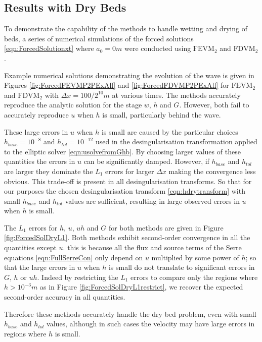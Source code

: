 \subsection{Results with Dry Beds} 
To demonstrate the capability of the methods to handle wetting and drying of beds, a series of numerical simulations of the forced solutions \eqref{eqn:ForcedSolutionxt} where $a_0 = 0m$ were conducted using $\text{FEVM}_2$ and $\text{FDVM}_2$. 

Example numerical solutions demonstrating the evolution of the wave is given in Figures \ref{fig:ForcedFEVMP2PExAll} and \ref{fig:ForcedFDVMP2PExAll} for $\text{FEVM}_2$ and $\text{FDVM}_2$ with $\Delta x = 100/ 2^{10} m$ at various times. The methods accurately reproduce the analytic solution for the stage $w$, $h$ and $G$. However, both fail to accurately reproduce $u$ when $h$ is small, particularly behind the wave.

These large errors in $u$ when $h$ is small are caused by the particular choices $h_{{base}} = 10^{-8}$ and $h_{{tol}}  = 10^{-12}$ used in the desingularisation transformation applied to the elliptic solver \eqref{eqn:usolvefromGhb}. By choosing larger values of these quantities the errors in $u$ can be significantly damped. However, if $h_{{base}}$ and $h_{{tol}}$ are larger they dominate the $L_1$ errors for larger $\Delta x$ making the convergence less obvious. This trade-off is present in all desingularisation transforms. So that for our purposes the chosen desingularisation transform \eqref{eqn:hdrytransform} with small $h_{{base}}$ and $h_{{tol}}$ values are sufficient, resulting in large observed errors in $u$ when $h$ is small.

The $L_1$ errors for $h$, $u$, $uh$ and $G$ for both methods are given in Figure \ref{fig:ForcedSolDryL1}. Both methods exhibit second-order convergence in all the quantities except $u$. this is because all the flux and source terms of the Serre equations \eqref{eqn:FullSerreCon} only depend on $u$ multiplied by some power of $h$; so that the large errors in $u$ when $h$ is small do not translate to significant errors in $G$, $h$ or $uh$. Indeed by restricting the $L_1$ errors to compare only the regions where $h > 10^{-3} m$ as in Figure \ref{fig:ForcedSolDryL1restrict}, we recover the expected second-order accuracy in all quantities.

Therefore these methods accurately handle the dry bed problem, even with small $h_{{base}}$ and $h_{{tol}}$ values, although in such cases the velocity may have large errors in regions where $h$ is small. 


